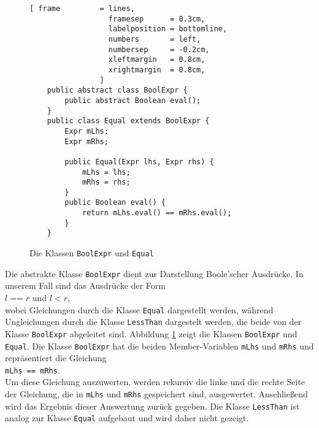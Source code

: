 \begin{figure}[!ht]
\centering
\begin{Verbatim}[ frame         = lines, 
                  framesep      = 0.3cm, 
                  labelposition = bottomline,
                  numbers       = left,
                  numbersep     = -0.2cm,
                  xleftmargin   = 0.8cm,
                  xrightmargin  = 0.8cm,
                ]
    public abstract class BoolExpr {
        public abstract Boolean eval();
    }
    public class Equal extends BoolExpr {
        Expr mLhs;
        Expr mRhs;
        
        public Equal(Expr lhs, Expr rhs) {
            mLhs = lhs;
            mRhs = rhs;
        }
        public Boolean eval() {
            return mLhs.eval() == mRhs.eval();
        }
    }        
\end{Verbatim}
\vspace*{-0.3cm}
\caption{Die Klassen \texttt{BoolExpr} und \texttt{Equal}}
\label{fig:BoolExpr.java}
\end{figure}

\pagebreak
Die abstrakte Klasse \texttt{BoolExpr} dient zur Darstellung Boole'scher Ausdr\"ucke.  In unserem Fall
sind das Ausdr\"ucke der Form
\\[0.2cm]
\hspace*{1.3cm}
$l \;\texttt{==}\; r$ \quad und \quad $l < r$,
\\[0.2cm]
wobei Gleichungen durch die Klasse \texttt{Equal} dargestellt werden, w\"ahrend Ungleichungen durch die
Klasse \texttt{LessThan} dargestelt werden, die beide von der Klasse \texttt{BoolExpr} abgeleitet
sind.  Abbildung \ref{fig:BoolExpr.java} zeigt die Klassen \texttt{BoolExpr} und \texttt{Equal}.
Die Klasse \texttt{BoolExpr} hat die beiden Member-Variablen \texttt{mLhs} und
\texttt{mRhs} und repr\"asentiert die Gleichung
\\[0.2cm]
\hspace*{1.3cm}
\texttt{mLhs == mRhs}.
\\[0.2cm]
Um diese Gleichung auszuwerten, werden rekursiv die linke und die rechte Seite der
Gleichung, die in \texttt{mLhs} und \texttt{mRhs} gespeichert sind, ausgewertet.
Anschlie{\ss}end wird das Ergebnis dieser Auswertung zur\"uck gegeben.
Die Klasse \texttt{LessThan} ist analog zur Klasse \texttt{Equal} aufgebaut und wird daher nicht
gezeigt.

